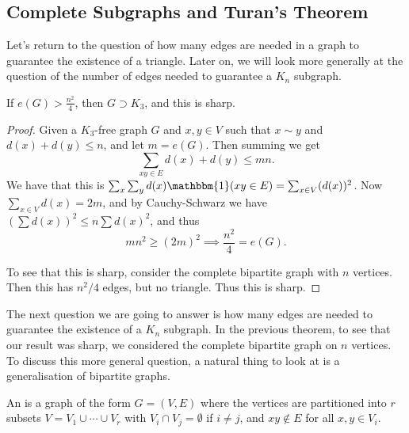 \documentclass[a4paper]{scrartcl}
\begin{document}
\subsection{Complete Subgraphs and Turan's Theorem}

Let's return to the question of how many edges are needed in a graph to guarantee the existence of a triangle. Later on, we will look more generally at the question of the number of edges needed to guarantee a $K_n$ subgraph.

\begin{theorem}
	If $e(G) > \frac{n^2}{4}$, then $G \supset K_3$, and this is sharp.
\end{theorem}
\begin{proof}
	Given a $K_3$-free graph $G$ and $x, y \in V$ such that $x \sim y$ and $d(x) + d(y) \leq n$, and let $m = e(G)$.
	Then summing we get
	$$
	\sum_{xy \in E} d(x) + d(y) \leq mn.
	$$
	We have that this is $\sum_x \sum_y d(x) \mathbbm{1}(xy \in E) = \sum_{x \in V} (d(x))^2$.
	Now $\sum_{x \in V} d(x) = 2m$, and by Cauchy-Schwarz we have $(\sum d(x))^2 \leq n\sum d(x)^2$, and thus
	$$
	m n^2 \geq (2m)^2 \implies \frac{n^2}{4} = e(G).
	$$

	To see that this is sharp, consider the complete bipartite graph with $n$ vertices. Then this has $n^2/4$ edges, but no triangle. Thus this is sharp.
\end{proof}

The next question we are going to answer is how many edges are needed to guarantee the existence of a $K_n$ subgraph. In the previous theorem, to see that our result was sharp, we considered the complete bipartite graph on $n$ vertices. To discuss this more general question, a natural thing to look at is a generalisation of bipartite graphs.

\begin{definition}
    An  is a graph of the form $G = (V, E)$ where the vertices are partitioned into $r$ subsets $V = V_1 \cup \cdots \cup V_r$ with $V_i \cap V_j = \emptyset$ if $i \neq j$, and $xy \not\in E$ for all $x, y \in V_i$.
\end{definition}
\end{document}
